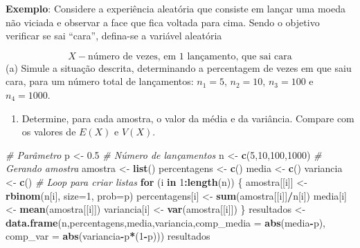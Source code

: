 \documentclass[
]{book}
\newenvironment{Shaded}{\begin{snugshade}}{\end{snugshade}}
\newcommand{\AttributeTok}[1]{\textcolor[rgb]{0.13,0.29,0.53}{#1}}
\newcommand{\CommentTok}[1]{\textcolor[rgb]{0.56,0.35,0.01}{\textit{#1}}}
\newcommand{\ControlFlowTok}[1]{\textcolor[rgb]{0.13,0.29,0.53}{\textbf{#1}}}
\newcommand{\DecValTok}[1]{\textcolor[rgb]{0.00,0.00,0.81}{#1}}
\newcommand{\FloatTok}[1]{\textcolor[rgb]{0.00,0.00,0.81}{#1}}
\newcommand{\FunctionTok}[1]{\textcolor[rgb]{0.13,0.29,0.53}{\textbf{#1}}}
\newcommand{\NormalTok}[1]{#1}
\newcommand{\OtherTok}[1]{\textcolor[rgb]{0.56,0.35,0.01}{#1}}
\newcommand{\SpecialCharTok}[1]{\textcolor[rgb]{0.81,0.36,0.00}{\textbf{#1}}}
\providecommand{\tightlist}{%
  \setlength{\itemsep}{0pt}\setlength{\parskip}{0pt}}
\begin{document}
\textbf{Exemplo}: Considere a experiência aleatória que consiste em lançar
uma moeda não viciada e observar a face que fica voltada para cima.
Sendo o objetivo verificar se sai ``cara'', defina-se a variável aleatória

\[X - \text{número de vezes, em 1 lançamento, que sai cara}\] (a) Simule
a situação descrita, determinando a percentagem de vezes em que saiu
cara, para um número total de lançamentos: \(n_1 = 5\), \(n_2=10\),
\(n_3=100\) e \(n_4=1000\).

\begin{enumerate}
\def\labelenumi{(\alph{enumi})}
\setcounter{enumi}{1}
\tightlist
\item
  Determine, para cada amostra, o valor da média e da variância.
  Compare com os valores de \(E(X)\) e \(V(X)\).
\end{enumerate}

\begin{Shaded}
\begin{Highlighting}[]
\CommentTok{\# Parâmetro}
\NormalTok{p }\OtherTok{\textless{}{-}} \FloatTok{0.5}
\CommentTok{\# Número de lançamentos}
\NormalTok{n }\OtherTok{\textless{}{-}} \FunctionTok{c}\NormalTok{(}\DecValTok{5}\NormalTok{,}\DecValTok{10}\NormalTok{,}\DecValTok{100}\NormalTok{,}\DecValTok{1000}\NormalTok{)}
\CommentTok{\# Gerando amostra}
\NormalTok{amostra }\OtherTok{\textless{}{-}} \FunctionTok{list}\NormalTok{()}
\NormalTok{percentagens }\OtherTok{\textless{}{-}} \FunctionTok{c}\NormalTok{()}
\NormalTok{media }\OtherTok{\textless{}{-}} \FunctionTok{c}\NormalTok{()}
\NormalTok{variancia }\OtherTok{\textless{}{-}} \FunctionTok{c}\NormalTok{()}
\CommentTok{\# Loop para criar listas}
\ControlFlowTok{for}\NormalTok{ (i }\ControlFlowTok{in} \DecValTok{1}\SpecialCharTok{:}\FunctionTok{length}\NormalTok{(n)) \{}
\NormalTok{  amostra[[i]] }\OtherTok{\textless{}{-}} \FunctionTok{rbinom}\NormalTok{(n[i], }\AttributeTok{size=}\DecValTok{1}\NormalTok{, }\AttributeTok{prob=}\NormalTok{p)}
\NormalTok{  percentagens[i] }\OtherTok{\textless{}{-}} \FunctionTok{sum}\NormalTok{(amostra[[i]]}\SpecialCharTok{/}\NormalTok{n[i])}
\NormalTok{  media[i] }\OtherTok{\textless{}{-}} \FunctionTok{mean}\NormalTok{(amostra[[i]])}
\NormalTok{  variancia[i] }\OtherTok{\textless{}{-}} \FunctionTok{var}\NormalTok{(amostra[[i]])}
\NormalTok{\}}
\NormalTok{resultados }\OtherTok{\textless{}{-}} \FunctionTok{data.frame}\NormalTok{(n,percentagens,media,variancia,}\AttributeTok{comp\_media =} \FunctionTok{abs}\NormalTok{(media}\SpecialCharTok{{-}}\NormalTok{p), }\AttributeTok{comp\_var =} \FunctionTok{abs}\NormalTok{(variancia}\SpecialCharTok{{-}}\NormalTok{p}\SpecialCharTok{*}\NormalTok{(}\DecValTok{1}\SpecialCharTok{{-}}\NormalTok{p)))}
\NormalTok{resultados}
\end{Highlighting}
\end{Shaded}
\end{document}
